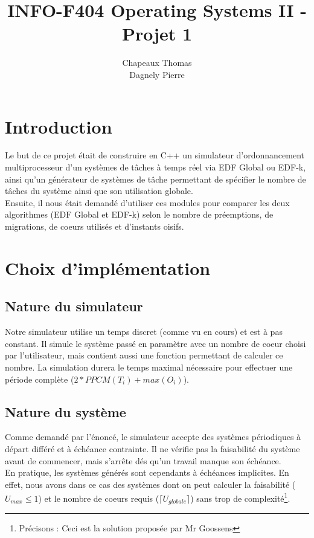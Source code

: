 \documentclass[a4paper,10pt]{article}
\title{INFO-F404 Operating Systems II - Projet 1}
\author{Chapeaux Thomas\\Dagnely Pierre}
\begin{document}
\maketitle

\section{Introduction}

Le but de ce projet était de construire en C++ un simulateur d'ordonnancement multiprocesseur d'un systèmes de tâches à temps réel via EDF Global ou EDF-k, ainsi qu'un générateur de systèmes de tâche permettant de spécifier le nombre de tâches du système ainsi que son utilisation globale.\\

Ensuite, il nous était demandé d'utiliser ces modules pour comparer les deux algorithmes (EDF Global et EDF-k) selon le nombre de préemptions, de migrations, de coeurs utilisés et d'instants oisifs.

\section{Choix d'implémentation}

\subsection{Nature du simulateur}
Notre simulateur utilise un temps discret (comme vu en cours) et est à pas constant. Il simule le système passé en paramètre avec un nombre de coeur choisi par l'utilisateur, mais contient aussi une fonction permettant de calculer ce nombre. La simulation durera le temps maximal nécessaire pour effectuer une période complète ($2*PPCM(T_i) + max(O_i)$).

\subsection{Nature du système}
Comme demandé par l'énoncé, le simulateur accepte des systèmes périodiques à départ différé et à échéance contrainte. Il ne vérifie pas la faisabilité du système avant de commencer, mais s'arrête dés qu'un travail manque son échéance.\\

En pratique, les systèmes générés sont cependants à échéances implicites.
En effet, nous avons dans ce cas des systèmes dont on peut calculer la faisabilité ($U_{max} \le 1$) et le nombre de coeurs requis ($\lceil U_{globale} \rceil$) sans trop de complexité\footnote{Précisons : Ceci est la solution proposée par Mr Goossens}.
\end{document}
